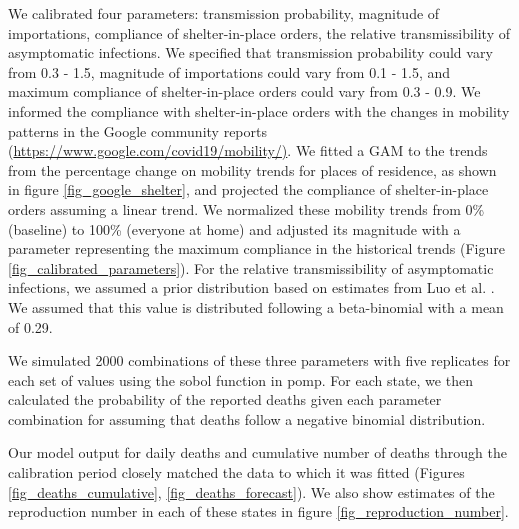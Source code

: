 \documentclass[11pt]{article}
\begin{document}
We calibrated four parameters: transmission probability, magnitude of importations, compliance of shelter-in-place orders, the relative transmissibility of asymptomatic infections. We specified that transmission probability could vary from 0.3 - 1.5, magnitude of importations could vary from 0.1 - 1.5, and maximum compliance of shelter-in-place orders could vary from 0.3 - 0.9. We informed the compliance with shelter-in-place orders with the changes in mobility patterns in the Google community reports (\url{https://www.google.com/covid19/mobility/)}. We fitted a GAM to the trends from the percentage change on mobility trends for places of residence, as shown in figure \ref{fig_google_shelter}, and projected the compliance of shelter-in-place orders assuming a linear trend. We normalized these mobility trends from 0\% (baseline) to 100\% (everyone at home) and adjusted its magnitude with a parameter representing the maximum compliance in the historical trends (Figure \ref{fig_calibrated_parameters}). For the relative transmissibility of asymptomatic infections, we assumed a prior distribution based on estimates from Luo et al. \cite{Luo2020_Contact_MedRxiv}. We assumed that this value is distributed following a beta-binomial with a mean of 0.29.

We simulated 2000 combinations of these three parameters with five replicates for each set of values using the sobol function in pomp. For each state, we then calculated the probability of the reported deaths given each parameter combination for assuming that deaths follow a negative binomial distribution. 

Our model output for daily deaths and cumulative number of deaths through the calibration period closely matched the data to which it was fitted (Figures \ref{fig_deaths_cumulative}, \ref{fig_deaths_forecast}).  We also show estimates of the reproduction number in each of these states in figure \ref{fig_reproduction_number}. 
\end{document}
